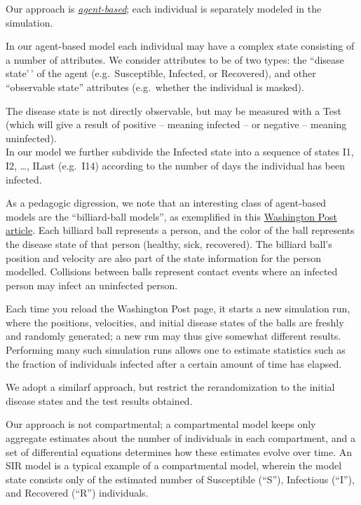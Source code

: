 \documentclass[11pt]{article}
\begin{document}
Our approach is
\href{https://en.wikipedia.org/wiki/Agent-based_model}{\emph{agent-based}};
each individual is separately modeled in the simulation.

In our agent-based model each individual may have a complex state
consisting of a number of attributes. We consider attributes to be of
two types: the ``disease state'\,' of the agent (e.g.~Susceptible,
Infected, or Recovered), and other ``observable state'' attributes
(e.g.~whether the individual is masked).

The disease state is not directly observable, but may be measured with a
Test (which will give a result of positive -- meaning infected -- or
negative -- meaning uninfected).\\
In our model we further subdivide the Infected state into a sequence of
states I1, I2, \ldots, ILast (e.g.~I14) according to the number of days
the individual has been infected.

As a pedagogic digression, we note that an interesting class of
agent-based models are the ``billiard-ball models'', as exemplified in
this
\href{https://www.washingtonpost.com/graphics/2020/world/corona-simulator/}{Washington
Post article}. Each billiard ball represents a person, and the color of
the ball represents the disease state of that person (healthy, sick,
recovered). The billiard ball's position and velocity are also part of
the state information for the person modelled. Collisions between balls
represent contact events where an infected person may infect an
uninfected person.

Each time you reload the Washington Post page, it starts a new
simulation run, where the positions, velocities, and initial disease
states of the balls are freshly and randomly generated; a new run may
thus give somewhat different results. Performing many such simulation
runs allows one to estimate statistics such as the fraction of
individuals infected after a certain amount of time has elapsed.

We adopt a similarf approach, but restrict the rerandomization to the
initial disease states and the test results obtained.

Our approach is not compartmental; a compartmental model keeps only
aggregate estimates about the number of individuals in each compartment,
and a set of differential equations determines how these estimates
evolve over time. An SIR model is a typical example of a compartmental
model, wherein the model state consists only of the estimated number of
Susceptible (``S''), Infectious (``I''), and Recovered (``R'')
individuals.
\end{document}
